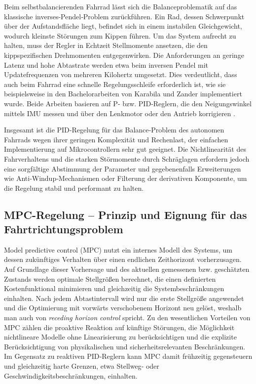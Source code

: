 Beim selbstbalancierenden Fahrrad lässt sich die Balanceproblematik auf das klassische 
inverses-Pendel‑Problem zurückführen.  
Ein Rad, dessen Schwerpunkt über der Aufstandsfläche liegt, befindet sich in einem instabilen Gleichgewicht, wodurch kleinste Störungen 
zum Kippen führen.  Um das System aufrecht zu halten, muss der Regler in Echtzeit Stellmomente ansetzen, die den kippspezifischen 
Drehmomenten entgegenwirken.  Die Anforderungen an geringe Latenz und hohe Abtastrate werden etwa beim inversen Pendel mit Updatefrequenzen 
von mehreren Kilohertz umgesetzt.  Dies verdeutlicht, dass auch beim Fahrrad eine schnelle Regelungsschleife erforderlich ist, wie sie 
beispielsweise in den Bachelorarbeiten von Karabila und Zander implementiert wurde. Beide Arbeiten basieren auf P‑ bzw. PID‑Reglern, die den 
Neigungswinkel mittels IMU messen und über den Lenkmotor oder den Antrieb korrigieren \citep{concurrent_rt_inverted_pendulum}.

Insgesamt ist die PID‑Regelung für das Balance‑Problem des autonomen Fahrrads wegen ihrer geringen Komplexität und Rechenlast, der 
einfachen Implementierung auf Mikrocontrollern sehr gut geeignet.  Die Nichtlinearität 
des Fahrverhaltens und die starken Störmomente durch Schräglagen erfordern jedoch eine sorgfältige Abstimmung der Parameter und 
gegebenenfalls Erweiterungen wie Anti‑Windup‑Mechanismen oder Filterung der derivativen Komponente, um die Regelung stabil und performant zu halten.


\subsection{MPC-Regelung – Prinzip und Eignung für das Fahrtrichtungsproblem}
Model predictive control (MPC) nutzt ein internes Modell des Systems, um dessen zukünftiges Verhalten über einen endlichen Zeithorizont vorherzusagen.  
Auf Grundlage dieser Vorhersage und des aktuellen gemessenen bzw. geschätzten Zustands werden optimale Stellgrößen berechnet, die einen definierten 
Kostenfunktional minimieren und gleichzeitig die Systembeschränkungen einhalten.  Nach jedem Abtastintervall wird nur die erste Stellgröße angewendet
und die Optimierung mit vorwärts verschobenem Horizont neu gelöst, weshalb man auch von \emph{receding horizon control} spricht.  Zu den wesentlichen 
Vorteilen von MPC zählen die proaktive Reaktion auf künftige Störungen, die Möglichkeit nichtlineare Modelle ohne Linearisierung zu berücksichtigen 
und die explizite Berücksichtigung von physikalischen und sicherheitsrelevanten Beschränkungen.  Im Gegensatz zu reaktiven PID‑Reglern kann MPC damit 
frühzeitig gegensteuern und gleichzeitig harte Grenzen, etwa Stellweg‑ oder Geschwindigkeitsbeschränkungen, einhalten.

